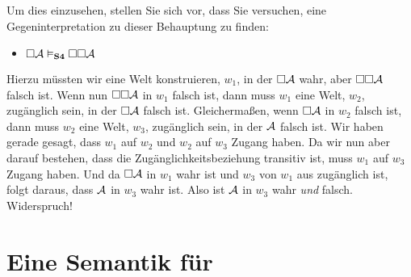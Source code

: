 Um dies einzusehen, stellen Sie sich vor, dass Sie versuchen, eine Gegeninterpretation zu dieser Behauptung zu finden:
\begin{itemize}
	\item[]$\Box\mathcal{A} \vDash_{\mathbf{S4}} \Box \Box \mathcal{A}$
\end{itemize}
Hierzu müssten wir eine Welt konstruieren, $w_1$, in der $\Box\mathcal{A}$ wahr, aber $\Box \Box \mathcal{A}$ falsch ist. Wenn nun $\Box \Box \mathcal{A}$ in $w_1$ falsch ist, dann muss $w_1$ eine Welt, $w_2$, zugänglich sein, in der $\Box\mathcal{A}$ falsch ist. Gleicherma{\ss}en, wenn $\Box \mathcal{A}$ in $w_2$ falsch ist, dann muss $w_2$ eine Welt, $w_3$, zugänglich sein, in der $\mathcal{A}$ falsch ist. Wir haben gerade gesagt, dass $w_1$ auf $w_2$ und $w_2$ auf $w_3$ Zugang haben. Da wir nun aber darauf bestehen, dass die Zugänglichkeitsbeziehung transitiv ist, muss $w_1$ auf $w_3$ Zugang haben. Und da $\Box\mathcal{A}$ in $w_1$ wahr ist und $w_3$ von $w_1$ aus zugänglich ist, folgt daraus, dass $\mathcal{A}$ in $w_3$ wahr ist. Also ist $\mathcal{A}$ in $w_3$ wahr \emph{und} falsch. Widerspruch!

\section{Eine Semantik für \mlSfive}
\label{SemanticsS5}

